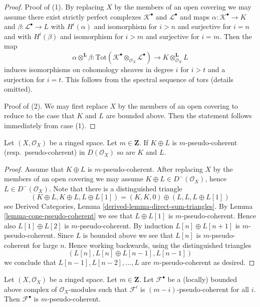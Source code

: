 \begin{proof}
Proof of (1). By replacing $X$ by the members of an open covering
we may assume there exist strictly perfect complexes $\mathcal{K}^\bullet$
and $\mathcal{L}^\bullet$ and maps
$\alpha : \mathcal{K}^\bullet \to K$ and
$\beta : \mathcal{L}^\bullet \to L$ with $H^i(\alpha)$ and isomorphism
for $i > n$ and surjective for $i = n$ and with
$H^i(\beta)$ and isomorphism for $i > m$ and surjective for $i = m$.
Then the map
$$
\alpha \otimes^\mathbf{L} \beta :
\text{Tot}(\mathcal{K}^\bullet \otimes_{\mathcal{O}_X} \mathcal{L}^\bullet)
\to K \otimes_{\mathcal{O}_X}^\mathbf{L} L
$$
induces isomorphisms on cohomology sheaves in degree $i$ for
$i > t$ and a surjection for $i = t$. This follows from the
spectral sequence of tors (details omitted).

\medskip\noindent
Proof of (2). We may first replace $X$ by the members of an open
covering to reduce to the case that $K$ and $L$ are bounded above.
Then the statement follows immediately from case (1).
\end{proof}

\begin{lemma}
\label{lemma-summands-pseudo-coherent}
Let $(X, \mathcal{O}_X)$ be a ringed space. Let $m \in \mathbf{Z}$.
If $K \oplus L$ is $m$-pseudo-coherent (resp.\ pseudo-coherent)
in $D(\mathcal{O}_X)$ so are $K$ and $L$.
\end{lemma}

\begin{proof}
Assume that $K \oplus L$ is $m$-pseudo-coherent.
After replacing $X$ by the members of an open covering we may
assume $K \oplus L \in D^-(\mathcal{O}_X)$, hence
$L \in D^-(\mathcal{O}_X)$.
Note that there is a distinguished triangle
$$
(K \oplus L, K \oplus L, L \oplus L[1]) =
(K, K, 0) \oplus (L, L, L \oplus L[1])
$$
see
Derived Categories, Lemma \ref{derived-lemma-direct-sum-triangles}.
By
Lemma \ref{lemma-cone-pseudo-coherent}
we see that $L \oplus L[1]$ is $m$-pseudo-coherent.
Hence also $L[1] \oplus L[2]$ is $m$-pseudo-coherent.
By induction $L[n] \oplus L[n + 1]$ is $m$-pseudo-coherent.
Since $L$ is bounded above we see that $L[n]$ is $m$-pseudo-coherent
for large $n$. Hence working backwards, using the distinguished triangles
$$
(L[n], L[n] \oplus L[n - 1], L[n - 1])
$$
we conclude that $L[n - 1], L[n - 2], \ldots, L$ are $m$-pseudo-coherent
as desired.
\end{proof}

\begin{lemma}
\label{lemma-complex-pseudo-coherent-modules}
Let $(X, \mathcal{O}_X)$ be a ringed space.
Let $m \in \mathbf{Z}$. Let $\mathcal{F}^\bullet$ be a (locally) bounded
above complex of $\mathcal{O}_X$-modules such that
$\mathcal{F}^i$ is $(m - i)$-pseudo-coherent for all $i$.
Then $\mathcal{F}^\bullet$ is $m$-pseudo-coherent.
\end{lemma}

